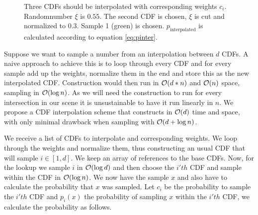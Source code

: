 \begin{figure}[htb]
    \caption{Three CDFs should be interpolated with corresponding weights $c_i$. Randomnumber $\xi$ is $0.55$. The second CDF is chosen, $\xi$ is cut and normalized to $0.3$. Sample 1 (green) is chosen. $p_{\text{interpolated}}$ is calculated according to equation \ref{eq:pinter}.} 
    \label{fig:interpolatedCDF}
\end{figure}

Suppose we want to sample a number from an interpolation between $d$ CDFs. A naive approach to achieve this is to loop through every CDF and for every sample add up the weights, normalize them in the end and store this as the new interpolated CDF. Construction would then run in $\mathcal{O}(d * n)$ and $\mathcal{O}(n)$ space, sampling in $\mathcal{O}(\log{n})$. As we will need the construction to run for every intersection in our scene it is unsustainable to have it run linearly in $n$. We propose a CDF interpolation scheme that constructs in $\mathcal{O}(d)$ time and space, with only minimal drawback when sampling with $\mathcal{O}(d + \log{n})$.

We receive a list of CDFs to interpolate and corresponding weights. We loop through the weights and normalize them, thus constructing an usual CDF that will sample $i \in [1,d]$. We keep an array of references to the base CDFs. Now, for the lookup we sample $i$ in $\mathcal{O}(\log{d})$ and then choose the $i'th$ CDF and sample within the CDF in $\mathcal{O}(\log{n})$. We now have the sample $x$ and also have to calculate the probability that $x$ was sampled. Let $c_i$ be the probability to sample the $i'th$ CDF and $p_i(x)$ the probability of sampling $x$ within the $i'th$ CDF, we calculate the probability as follows.

